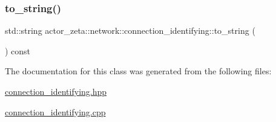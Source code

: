 \mbox{\label{classactor__zeta_1_1network_1_1connection__identifying_a460e8e57e12ec47497a1a996de5ad82e}} 
\subsubsection{\texorpdfstring{to\+\_\+string()}{to\_string()}}
{\footnotesize\ttfamily std\+::string actor\+\_\+zeta\+::network\+::connection\+\_\+identifying\+::to\+\_\+string (\begin{DoxyParamCaption}{ }\end{DoxyParamCaption}) const}



The documentation for this class was generated from the following files\+:\begin{DoxyCompactItemize}
\item 
\hyperlink{connection__identifying_8hpp}{connection\+\_\+identifying.\+hpp}\item 
\hyperlink{connection__identifying_8cpp}{connection\+\_\+identifying.\+cpp}\end{DoxyCompactItemize}
